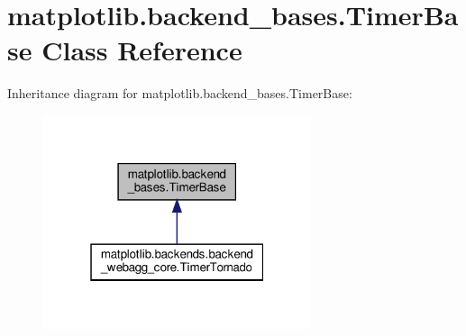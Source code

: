 \hypertarget{classmatplotlib_1_1backend__bases_1_1TimerBase}{}\section{matplotlib.\+backend\+\_\+bases.\+Timer\+Base Class Reference}
\label{classmatplotlib_1_1backend__bases_1_1TimerBase}


Inheritance diagram for matplotlib.\+backend\+\_\+bases.\+Timer\+Base\+:
\nopagebreak
\begin{figure}[H]
\begin{center}
\leavevmode
\includegraphics[width=223pt]{classmatplotlib_1_1backend__bases_1_1TimerBase__inherit__graph}
\end{center}
\end{figure}
